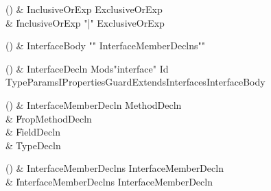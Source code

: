 \begin{bbgrammarappendix}{3.6in}

() & InclusiveOrExp \label{prod:InclusiveOrExp}  \: ExclusiveOrExp  \\

 &    \| InclusiveOrExp \xcd"|" ExclusiveOrExp \\

\end{bbgrammarappendix}

\begin{bbgrammarappendix}{3.7in}

() & InterfaceBody \label{prod:InterfaceBody}  \: \xcd"{" InterfaceMemberDeclns\opt \xcd"}"  \\


\end{bbgrammarappendix}

\begin{bbgrammarappendix}{3.6in}

() & InterfaceDecln \label{prod:InterfaceDecln}  \: Mods\opt \xcd"interface" Id TypeParamsI\opt Properties\opt Guard\opt ExtendsInterfaces\opt InterfaceBody  \\


\end{bbgrammarappendix}

\begin{bbgrammarappendix}{3.0in}

() & InterfaceMemberDecln \label{prod:InterfaceMemberDecln}  \: MethodDecln  \\

 &    \| PropMethodDecln \\
 &    \| FieldDecln \\
 &    \| TypeDecln \\

\end{bbgrammarappendix}

\begin{bbgrammarappendix}{2.9in}

() & InterfaceMemberDeclns \label{prod:InterfaceMemberDeclns}  \: InterfaceMemberDecln  \\

 &    \| InterfaceMemberDeclns InterfaceMemberDecln \\

\end{bbgrammarappendix}

